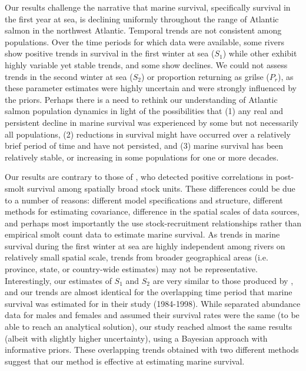 \documentclass[12pt]{article}
\newcommand{\So}{$S_{1}$\xspace}
\newcommand{\St}{$S_{2}$\xspace}
\newcommand{\Pg}{$P_r$\xspace}
\begin{document}
Our results challenge the narrative that marine survival, specifically survival in the first year at sea, is declining
uniformly throughout the range of Atlantic salmon in the northwest Atlantic.
Temporal trends are not consistent among populations. 
Over the time periods for which data were available, some rivers show positive trends in survival in the
first winter at sea (\So) while other exhibit highly variable yet stable trends, and some show
declines. We could not assess trends in the second winter at sea (\St) or
proportion returning as grilse (\Pg), as these parameter estimates were highly
uncertain and were strongly influenced by the priors.
Perhaps there is a need to rethink our understanding of Atlantic salmon
population dynamics in light of the possibilities that (1) any real and persistent decline in marine survival was
experienced by some but not necessarily all populations, (2) reductions in survival might
have occurred over a relatively brief period of time and have not persisted, and (3) marine survival has
been relatively stable, or increasing in some populations for one or more decades.

Our results are contrary to those of \citet{Olmos2019}, who detected positive
correlations in post-smolt survival among spatially broad stock units. These differences
could be due to a number of reasons: different model specifications and
structure, different methods for estimating covariance, difference in the
spatial scales of data sources, and perhaps most importantly the use stock-recruitment relationships
rather than empirical smolt count data to estimate marine survival.
As trends in marine survival during the first winter at sea are highly independent
among rivers on relatively small spatial scale, trends from broader
geographical areas (i.e. province, state, or country-wide estimates) may not
be representative.
Interestingly, our estimates of \So and \St are very similar to those produced
by \citet{Chaput2003b}, and our trends are almost identical for the
overlapping time period that marine survival was estimated for in their study
(1984-1998). 
While \citet{Chaput2003b} separated abundance data for males and females
and assumed their survival rates were the same (to be able to reach an
analytical solution), our study reached almost the same results (albeit with
slightly higher uncertainty), using a Bayesian approach with informative
priors. These overlapping trends obtained with two different methods 
suggest that our method is effective at estimating marine survival.
\end{document}
